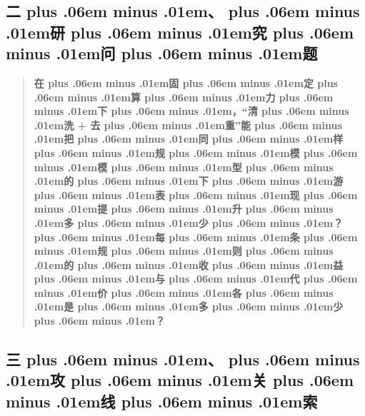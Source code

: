 \documentclass[
]{article}
\def\zh#1{{\zhfont #1}}
\def\zhglue{\hskip0pt plus .06em minus .01em}
\begin{document}
\subsection{\zh{二\zhglue 、\zhglue 研\zhglue 究\zhglue 问\zhglue 题}}\label{ux4e8cux7814ux7a76ux95eeux9898}

\begin{quote}
\textbf{\zh{在\zhglue 固\zhglue 定\zhglue 算\zhglue 力\zhglue 下\zhglue ，}``\zh{清\zhglue 洗} + \zh{去\zhglue 重}''\zh{能\zhglue 把\zhglue 同\zhglue 样\zhglue 规\zhglue 模\zhglue 模\zhglue 型\zhglue 的\zhglue 下\zhglue 游\zhglue 表\zhglue 现\zhglue 提\zhglue 升\zhglue 多\zhglue 少\zhglue ？\zhglue 每\zhglue 条\zhglue 规\zhglue 则\zhglue 的\zhglue 收\zhglue 益\zhglue 与\zhglue 代\zhglue 价\zhglue 各\zhglue 是\zhglue 多\zhglue 少\zhglue ？}}
\end{quote}

\subsection{\zh{三\zhglue 、\zhglue 攻\zhglue 关\zhglue 线\zhglue 索}}\label{ux4e09ux653bux5173ux7ebfux7d22}
\end{document}
